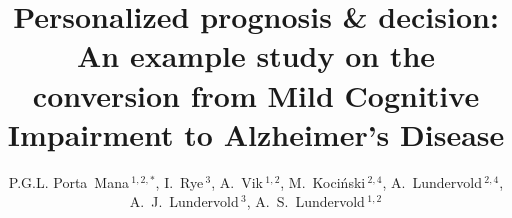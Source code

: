 \documentclass[utf8]{FrontiersinHarvard} %
\renewcommand*{\|}[1][]{\nonscript\:#1\vert\nonscript\:\mathopen{}}
\def\firstAuthorLast{Sample {et~al.}} %
\def\Authors{P.G.L. Porta~Mana\,$^{1,2,*}$, I.~Rye\,$^{3}$, A.~Vik\,$^{1,2}$, M.~Koci\'nski\,$^{2,4}$, A.~Lundervold\,$^{2,4}$, A.~J.~Lundervold\,$^{3}$, A.~S.~Lundervold\,$^{1,2}$}
\begin{document}
\onecolumn
{}

\title[Conversion from Mild Cognitive Impairment to Alzheimer's Disease]{Personalized prognosis \& decision:\\ An example study on the conversion from Mild Cognitive Impairment to Alzheimer's Disease} 

\author[\firstAuthorLast ]{\Authors} %
\address{} %
\correspondance{} %

\extraAuth{}%


\maketitle
\end{document}
